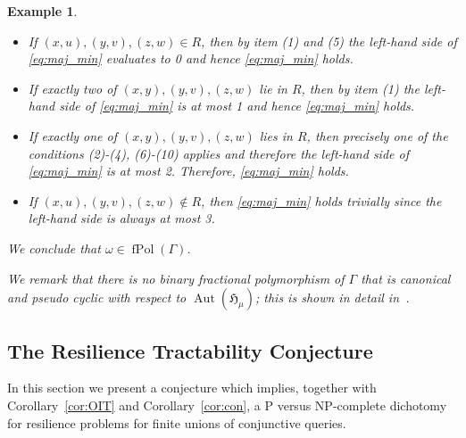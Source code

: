 \documentclass[nonacm]{acmart}
\newcommand{\bH}{{\mathfrak H}}
\DeclareMathOperator{\Aut}{Aut}
\DeclareMathOperator{\fPol}{fPol}
\newtheorem{expl}[theorem]{Example}
\begin{document}
\begin{expl}
\begin{itemize}
    \item If $(x,u), (y,v), (z,w) \in R$, then by item (1) and (5) the left-hand side of \eqref{eq:maj_min} evaluates to 0 and hence \eqref{eq:maj_min} holds.
    \item If exactly two of $(x,y), (y,v), (z,w)$ lie in $R$, then by item (1) the left-hand side of \eqref{eq:maj_min} is at most 1 and hence \eqref{eq:maj_min} holds.
    \item If exactly one of $(x,y), (y,v), (z,w)$ lies in $R$, then precisely one of the conditions (2)-(4), (6)-(10) applies and therefore the left-hand side of \eqref{eq:maj_min} is at most 2. Therefore, \eqref{eq:maj_min} holds.
    \item If $(x,u), (y,v), (z,w) \notin R$, then \eqref{eq:maj_min} holds trivially since the left-hand side is always at most 3.
\end{itemize}
We conclude that $\omega \in \fPol(\Gamma)$.

We remark that there is no binary fractional polymorphism of $\Gamma$ that is canonical and pseudo cyclic with respect to $\Aut(\bH_\mu)$;  this is shown in detail in~\cite[Example 5.23]{ThesisZaneta}. 
\end{expl}

\subsection{The Resilience Tractability Conjecture}

In this section we present a conjecture which implies,  together with Corollary~\ref{cor:OIT} and Corollary~\ref{cor:con}, a P versus NP-complete dichotomy for resilience problems for finite unions of conjunctive queries. 
\end{document}
